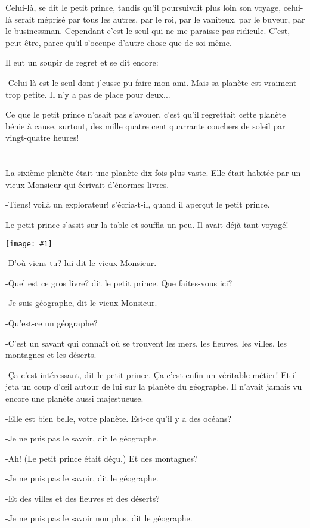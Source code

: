 \documentclass{report}
\newcommand{\parachapter}[2][]{\chapter[#1]{#2}}
\newcommand{\incpic}[1]{%
\begin{center}
    \texttt{[image: \#1]}
\end{center}%
}
\begin{document}
Celui-là, se dit le petit prince, tandis qu'il poursuivait plus loin son voyage, celui-là serait méprisé par tous les autres, par le roi, par le vaniteux, par le buveur, par le businessman. Cependant c'est le seul qui ne me paraisse pas ridicule. C'est, peut-être, parce qu'il s'occupe d'autre chose que de soi-même.

Il eut un soupir de regret et se dit encore:

-Celui-là est le seul dont j'eusse pu faire mon ami. Mais sa planète est vraiment trop petite. Il n'y a pas de place pour deux...

Ce que le petit prince n'osait pas s'avouer, c'est qu'il regrettait cette planète bénie à cause, surtout, des mille quatre cent quarrante couchers de soleil par vingt-quatre heures!
\parachapter{} %

La sixième planète était une planète dix fois plus vaste. Elle était habitée par un vieux Monsieur qui écrivait d'énormes livres.

-Tiens! voilà un explorateur! s'écria-t-il, quand il aperçut le petit prince.

Le petit prince s'assit sur la table et souffla un peu. Il avait déjà tant voyagé!

\incpic{pic/image30.jpeg}

-D'où viens-tu? lui dit le vieux Monsieur.

-Quel est ce gros livre? dit le petit prince. Que faites-vous ici?

-Je suis géographe, dit le vieux Monsieur.

-Qu'est-ce un géographe?

-C'est un savant qui connaît où se trouvent les mers, les fleuves, les villes, les montagnes et les déserts.

-Ça c'est intéressant, dit le petit prince. Ça c'est enfin un véritable métier! Et il jeta un coup d'œil autour de lui sur la planète du géographe. Il n'avait jamais vu encore une planète aussi majestueuse.

-Elle est bien belle, votre planète. Est-ce qu'il y a des océans?

-Je ne puis pas le savoir, dit le géographe.

-Ah! (Le petit prince était déçu.) Et des montagnes?

-Je ne puis pas le savoir, dit le géographe.

-Et des villes et des fleuves et des déserts?

-Je ne puis pas le savoir non plus, dit le géographe.
\end{document}
